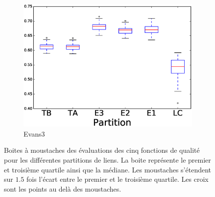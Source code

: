 \begin{figure}
\begin{subfigure}{0.31\textwidth}
		\includegraphics[width=\linewidth]{img/ExpectedNodes/LF/LFR1_Evans3_ALL.eps}
		\caption{\label{fig:LFE3}Evans3}		
	\end{subfigure}
	\caption{Boites à moustaches des évaluations des cinq fonctions de qualité pour les différentes partitions de liens. 
	La boite représente le premier et troisième quartile ainsi que la médiane.
	Les moustaches s'étendent sur $1.5$ fois l'écart entre le premier et le troisième quartile. 
	Les croix sont les points au delà des moustaches.
	}
	\label{fig:LF}
\end{figure}


